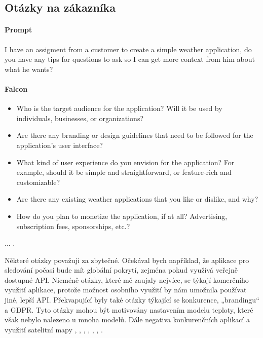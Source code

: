 \documentclass[FM,DP]{tulthesis}
\begin{document}
		\subsection{Otázky na zákazníka}
		\vspace{0.6em}
		\begin{tcolorbox}[colback=white,colframe=black]
			\paragraph{Prompt} I have an assigment from a customer to create a simple weather application, do you have any tips for questions to ask so I can get more context from him about what he wants?
			
			\vspace{0.6em}
			
			\paragraph{Falcon} 
			\begin{itemize}
				\item Who is the target audience for the application? Will it be used by individuals, businesses, or organizations?
				\item Are there any branding or design guidelines that need to be followed for the application's user interface?
				\item What kind of user experience do you envision for the application? For example, should it be simple and straightforward, or feature-rich and customizable?
				\item Are there any existing weather applications that you like or dislike, and why?
				\item How do you plan to monetize the application, if at all? Advertising, subscription fees, sponsorships, etc.? 
			\end{itemize}
			... \cite{falcon_analyza}.
		\end{tcolorbox}
		
		
		Některé otázky považuji za zbytečné. Očekával bych například, že aplikace pro sledování počasí bude mít globální pokrytí, zejména pokud využívá veřejně dostupné API. Nicméně otázky, které mě zaujaly nejvíce, se týkají komerčního využití aplikace, protože možnost osobního využití by nám umožnila používat jiné, lepší API. Překvapující byly také otázky týkající se konkurence, „brandingu“ a GDPR. Tyto otázky mohou být motivovány nastavením modelu teploty, které však nebylo nalezeno u mnoha modelů. Dále negativa konkurenčních aplikací a využití satelitní mapy \cite{codellama_analyza}, \cite{chatgpt_analyza}, \cite{bingCopilot_analyza}, \cite{gitCopilot_analyza}, \cite{bard_analyza}, \cite{claude_analyza}, \cite{falcon_analyza}.
		
\end{document}
